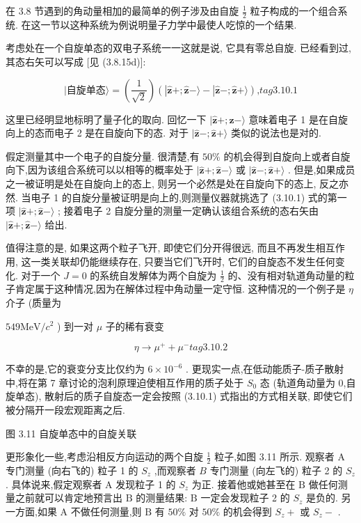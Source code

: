 在 3.8 节遇到的角动量相加的最简单的例子涉及由自旋 $\frac{1}{2}$ 粒子构成的一个组合系统. 在这一节以这种系统为例说明量子力学中最使人吃惊的一个结果.

考虑处在一个自旋单态的双电子系统一一这就是说, 它具有零总自旋. 已经看到过, 其态右矢可以写成 [见 (3.8.15d)]:

$$
|\text{自旋单态}\rangle = \left( \frac{1}{\sqrt{2}}\right) \left( {\left| {\widehat{\mathbf{z}}+;\widehat{\mathbf{z}} - \rangle - }\right| \widehat{\mathbf{z}}-;\widehat{\mathbf{z}} + \rangle }\right) \text{,} tag{3.10.1}
$$

这里已经明显地标明了量子化的取向. 回忆一下 $|\widehat{\mathbf{z}} + ;\widehat{\mathbf{z}} - \rangle$ 意味着电子 1 是在自旋向上的态而电子 2 是在自旋向下的态. 对于 $|\widehat{\mathbf{z}} - ;\widehat{\mathbf{z}} + \rangle$ 类似的说法也是对的.

假定测量其中一个电子的自旋分量. 很清楚,有 ${50}\%$ 的机会得到自旋向上或者自旋向下,因为该组合系统可以以相等的概率处于 $|\widehat{\mathbf{z}} + ;\widehat{\mathbf{z}} - \rangle$ 或 $|\widehat{\mathbf{z}} - ;\widehat{\mathbf{z}} + \rangle$ . 但是,如果成员之一被证明是处在自旋向上的态上, 则另一个必然是处在自旋向下的态上, 反之亦然. 当电子 1 的自旋分量被证明是向上的,则测量仪器就挑选了 (3.10.1) 式的第一项 $|\widehat{\mathbf{z}} + ;\widehat{\mathbf{z}} - \rangle$ ; 接着电子 2 自旋分量的测量一定确认该组合系统的态右矢由 $|\widehat{\mathbf{z}} + ;\widehat{\mathbf{z}} - \rangle$ 给出.

值得注意的是, 如果这两个粒子飞开, 即使它们分开得很远, 而且不再发生相互作用, 这一类关联却仍能继续存在, 只要当它们飞开时, 它们的自旋态不发生任何变化. 对于一个 $J = 0$ 的系统自发解体为两个自旋为 $\frac{1}{2}$ 的、没有相对轨道角动量的粒子肯定属于这种情况,因为在解体过程中角动量一定守恒. 这种情况的一个例子是 $\eta$ 介子 (质量为

${549}\mathrm{{MeV}}/{c}^{2}$ ) 到一对 $\mu$ 子的稀有衰变

$$
\eta \rightarrow {\mu }^{ + } + {\mu }^{ - } tag{3.10.2}
$$

不幸的是,它的衰变分支比仅约为 $6 \times {10}^{-6}$ . 更现实一点,在低动能质子-质子散射中,将在第 7 章讨论的泡利原理迫使相互作用的质子处于 ${S}_{0}$ 态 (轨道角动量为 0,自旋单态), 散射后的质子自旋态一定会按照 (3.10.1) 式指出的方式相关联, 即使它们被分隔开一段宏观距离之后.



图 3.11 自旋单态中的自旋关联

更形象化一些,考虑沿相反方向运动的两个自旋 $\frac{1}{2}$ 粒子,如图 3.11 所示. 观察者 $\mathrm{A}$ 专门测量 (向右飞的) 粒子 1 的 ${S}_{z}$ ,而观察者 $B$ 专门测量 (向左飞的) 粒子 2 的 ${S}_{z}$ . 具体说来,假定观察者 $\mathrm{A}$ 发现粒子 1 的 ${S}_{z}$ 为正. 接着他或她甚至在 $\mathrm{B}$ 做任何测量之前就可以肯定地预言出 $\mathrm{B}$ 的测量结果: $\mathrm{B}$ 一定会发现粒子 2 的 ${S}_{z}$ 是负的. 另一方面,如果 $\mathrm{A}$ 不做任何测量,则 $\mathrm{B}$ 有 ${50}\%$ 对 ${50}\%$ 的机会得到 ${S}_{z} +$ 或 ${S}_{z} -$ .

